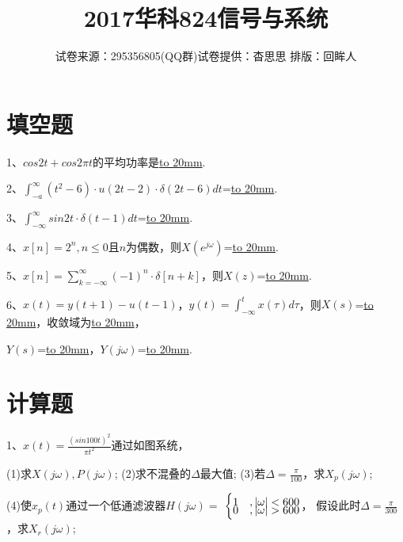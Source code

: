 \documentclass{article}
\begin{document}
\begin{spacing}{1.4}
\begin{CJK}{UTF8}{gbsn}
    \author{试卷来源：295356805(QQ群)\hspace{1cm}试卷提供：杳思思\hspace{1cm} 排版：回眸人}
    \title{2017华科824信号与系统}
    \maketitle

\section{填空题}
1、$cos2t+cos2\pi t$的平均功率是\underline{\hbox to 20mm{}}.
\vspace{1.5cm}

2、$\displaystyle\int_{-a}^{\infty}(t^2-6)\cdot u(2t-2)\cdot\delta(2t-6)dt$=\underline{\hbox to 20mm{}}.
\vspace{1.5cm}

3、$\displaystyle\int_{-\infty}^{\infty}sin2t\cdot\delta(t-1)dt$=\underline{\hbox to 20mm{}}.
\vspace{1.5cm}

4、$x[n]=2^n, n\leq 0$且$n$为偶数，则$X(e^{j\omega})$=\underline{\hbox to 20mm{}}.
\vspace{1.5cm}

5、$x[n]=\displaystyle\sum_{k=-\infty}^{\infty}(-1)^n\cdot\delta[n+k]$，则$X(z)$=\underline{\hbox to 20mm{}}.
\vspace{1.5cm}

6、$x(t)=y(t+1)-u(t-1)$，$y(t)=\displaystyle\int_{-\infty}^{t}x(\tau)d\tau$，则$X(s)$=\underline{\hbox to 20mm{}}，收敛域为\underline{\hbox to 20mm{}}，

\setlength{\parindent}{2em}
$Y(s)$=\underline{\hbox to 20mm{}}，$Y(j\omega)$=\underline{\hbox to 20mm{}}.
\setlength{\parindent}{0em}

\pagebreak

\section{计算题}
1、$x(t)=\displaystyle\frac{(sin100t)^2}{\pi t^2}$通过如图系统，

\setlength{\parindent}{2em}
(1)求$X(j\omega), P(j\omega)$;
(2)求不混叠的$\Delta$最大值;
(3)若$\Delta=\frac{\pi}{100}$，求$X_p(j\omega)$;

(4)使$x_p(t)$通过一个低通滤波器$H(j\omega)=$
$\begin{cases}
1&,|\omega|<600 \vspace{-7pt} \\
0&,|\omega|>600
\end{cases}$，
假设此时$\Delta=\frac{\pi}{300}$，求$X_r(j\omega)$;


\end{CJK}
\end{spacing}
\end{document}
